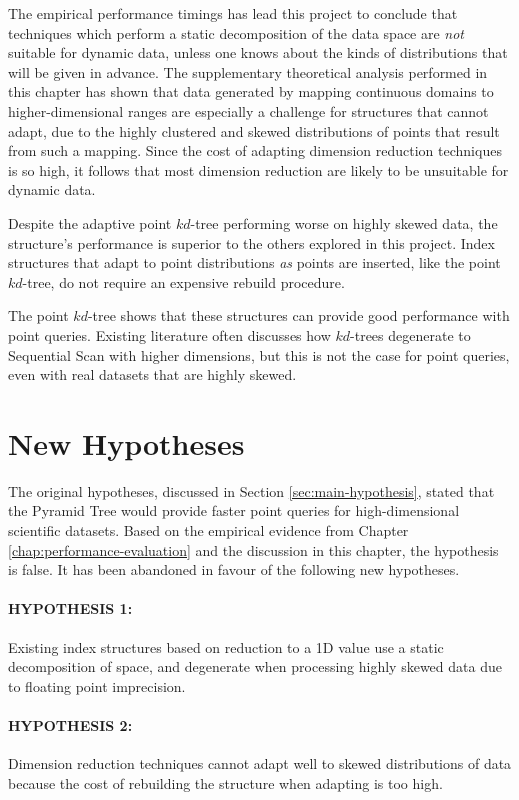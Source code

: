 The empirical performance timings has lead this project to conclude that techniques which perform a static decomposition of the data space are \textit{not} suitable for dynamic data, unless one knows about the kinds of distributions that will be given in advance. The supplementary theoretical analysis performed in this chapter has shown that data generated by mapping continuous domains to higher-dimensional ranges are especially a challenge for structures that cannot adapt, due to the highly clustered and skewed distributions of points that result from such a mapping. Since the cost of adapting dimension reduction techniques is so high, it follows that most dimension reduction are likely to be unsuitable for dynamic data.

Despite the adaptive point $kd$-tree performing worse on highly skewed data, the structure's performance is superior to the others explored in this project. Index structures that adapt to point distributions \textit{as} points are inserted, like the point $kd$-tree, do not require an expensive rebuild procedure.

The point $kd$-tree shows that these structures can provide good performance with point queries. Existing literature often discusses how $kd$-trees degenerate to Sequential Scan with higher dimensions, but this is not the case for point queries, even with real datasets that are highly skewed.

\section{New Hypotheses}

The original hypotheses, discussed in Section \ref{sec:main-hypothesis}, stated that the Pyramid Tree would provide faster point queries for high-dimensional scientific datasets. Based on the empirical evidence from Chapter \ref{chap:performance-evaluation} and the discussion in this chapter, the hypothesis is false. It has been abandoned in favour of the following new hypotheses.

\paragraph{\textbf{HYPOTHESIS 1:}} Existing index structures based on reduction to a 1D value use a static decomposition of space, and degenerate when processing highly skewed data due to floating point imprecision.

\paragraph{\textbf{HYPOTHESIS 2:}} Dimension reduction techniques cannot adapt well to skewed distributions of data because the cost of rebuilding the structure when adapting is too high.

